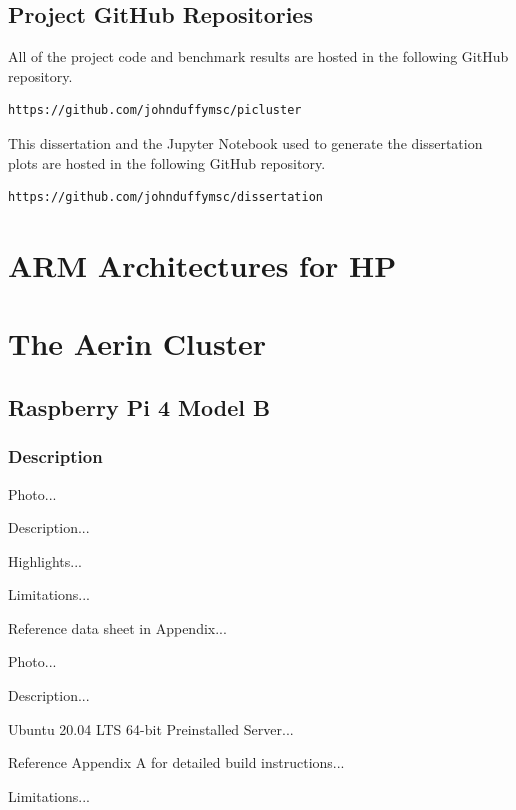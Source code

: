 \documentclass{report}
\begin{document}
%
%
\section{Project GitHub Repositories}

All of the project code and benchmark results are hosted in the following GitHub repository.

\begin{verbatim}
https://github.com/johnduffymsc/picluster
\end{verbatim}

This dissertation and the Jupyter Notebook used to generate the dissertation plots are hosted in the following GitHub repository.

\begin{verbatim}
https://github.com/johnduffymsc/dissertation
\end{verbatim}
 


%
%
\chapter{ARM Architectures for HP}



%
%
\chapter{The Aerin Cluster}

\section{Raspberry Pi 4 Model B}

\subsection{Description}

Photo...

Description...

Highlights...

Limitations...

Reference data sheet in Appendix...

Photo...

Description...

Ubuntu 20.04 LTS 64-bit Preinstalled Server...

Reference Appendix A for detailed build instructions...

Limitations...
\end{document}
